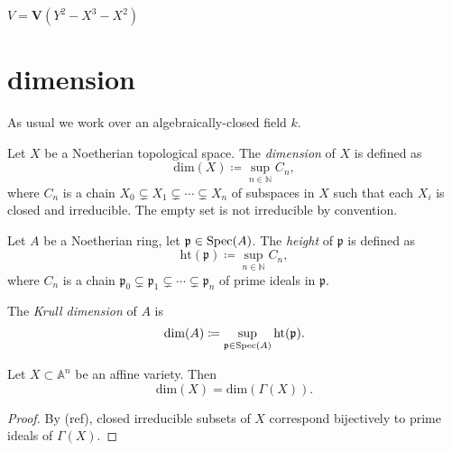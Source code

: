 \documentclass[12pt]{article}
\begin{document}
\begin{example}
	$V=\mathbf{V}(Y^2-X^3-X^2)$
\end{example}


\section{dimension} %

As usual we work over an algebraically-closed field $k$.

\begin{definition}
	Let $X$ be a Noetherian topological space. The \emph{dimension} of $X$ is defined as 
	\begin{equation*}
		\text{dim}(X) \coloneqq \sup_{n\in\mathbb{N}} C_n,
	\end{equation*}
	where $C_n$ is a chain $X_0\subsetneq X_1 \subsetneq \cdots\subsetneq X_n$ of subspaces in $X$ such that each $X_i$ is closed and irreducible. The empty set is not irreducible by convention.
\end{definition}

\begin{definition}
	Let $A$ be a Noetherian ring, let $\mathfrak{p}\in\text{Spec}(A)$. The \emph{height} of $\mathfrak{p}$ is defined as 
	\begin{equation*}
		\text{ht}(\mathfrak{p})\coloneqq\sup_{n\in\mathbb{N}}C_n,
	\end{equation*}
	where $C_n$ is a chain $\mathfrak{p}_0\subsetneq\mathfrak{p}_1\subsetneq\cdots\subsetneq\mathfrak{p}_n$ of prime ideals in $\mathfrak{p}$.

	The \emph{Krull dimension} of $A$ is 
	\begin{equation*}
		\text{dim}(A) \coloneqq \sup_{\mathfrak{p}\in\text{Spec}(A)}\text{ht}(\mathfrak{p}).
	\end{equation*}
\end{definition}

\begin{proposition}
	Let $X\subset\mathbb{A}^n$ be an affine variety. Then 
	\begin{equation*}
		\text{dim}(X) = \text{dim}(\Gamma(X)).
	\end{equation*}
\end{proposition}
\begin{proof}
	By (ref), closed irreducible subsets of $X$ correspond bijectively to prime ideals of $\Gamma(X)$.
\end{proof}
\end{document}
